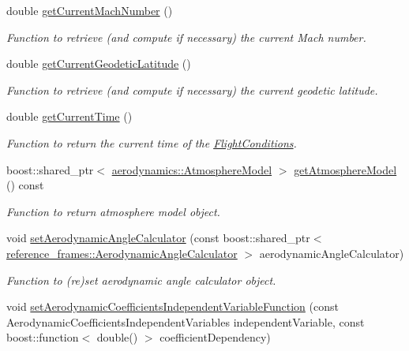 \begin{DoxyCompactItemize}
double \hyperlink{classtudat_1_1aerodynamics_1_1FlightConditions_aebdb26331700d0f1c742b6b25625d973}{get\+Current\+Mach\+Number} ()
\begin{DoxyCompactList}\small\item\em Function to retrieve (and compute if necessary) the current Mach number. \end{DoxyCompactList}\item 
double \hyperlink{classtudat_1_1aerodynamics_1_1FlightConditions_a61e90cedd2518bf5dc83498a46743a0a}{get\+Current\+Geodetic\+Latitude} ()
\begin{DoxyCompactList}\small\item\em Function to retrieve (and compute if necessary) the current geodetic latitude. \end{DoxyCompactList}\item 
double \hyperlink{classtudat_1_1aerodynamics_1_1FlightConditions_a0be39dd2b49d03fe576e73c3faa28ee8}{get\+Current\+Time} ()
\begin{DoxyCompactList}\small\item\em Function to return the current time of the \hyperlink{classtudat_1_1aerodynamics_1_1FlightConditions}{Flight\+Conditions}. \end{DoxyCompactList}\item 
boost\+::shared\+\_\+ptr$<$ \hyperlink{classtudat_1_1aerodynamics_1_1AtmosphereModel}{aerodynamics\+::\+Atmosphere\+Model} $>$ \hyperlink{classtudat_1_1aerodynamics_1_1FlightConditions_abe7c660416abceb97e068290a21ede22}{get\+Atmosphere\+Model} () const 
\begin{DoxyCompactList}\small\item\em Function to return atmosphere model object. \end{DoxyCompactList}\item 
void \hyperlink{classtudat_1_1aerodynamics_1_1FlightConditions_aa6f9223633f404140c8e43da7ce7615a}{set\+Aerodynamic\+Angle\+Calculator} (const boost\+::shared\+\_\+ptr$<$ \hyperlink{classtudat_1_1reference__frames_1_1AerodynamicAngleCalculator}{reference\+\_\+frames\+::\+Aerodynamic\+Angle\+Calculator} $>$ aerodynamic\+Angle\+Calculator)
\begin{DoxyCompactList}\small\item\em Function to (re)set aerodynamic angle calculator object. \end{DoxyCompactList}\item 
void \hyperlink{classtudat_1_1aerodynamics_1_1FlightConditions_aec5433b817a438eeecb844d524359708}{set\+Aerodynamic\+Coefficients\+Independent\+Variable\+Function} (const Aerodynamic\+Coefficients\+Independent\+Variables independent\+Variable, const boost\+::function$<$ double() $>$ coefficient\+Dependency)

\end{DoxyCompactItemize}
